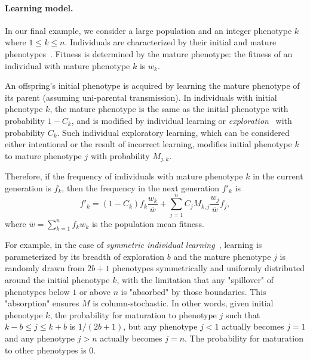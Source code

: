 \documentclass[9pt, a4paper, twocolumn]{extarticle}
\begin{document}
\paragraph*{Learning model.}\label{sec:learn_model}

In our final example, we consider a large population and an integer phenotype $k$ where $1 \le k \le n$.
Individuals are characterized by their initial and mature phenotypes~\citep[pg.~94]{Boyd1985}.
Fitness is determined by the mature phenotype: the fitness of an individual with mature phenotype $k$ is $w_k$.

An offspring's initial phenotype is acquired by learning the mature phenotype of its parent (assuming uni-parental transmission).
In individuals with initial phenotype $k$, the mature phenotype is the same as the initial phenotype with probability $1-C_k$, and is modified by individual learning or \emph{exploration}~\citep{Borenstein2008} with probability $C_k$.
Such individual exploratory learning, which can be considered either intentional or the result of incorrect learning, modifies initial phenotype $k$ to mature phenotype $j$ with probability $M_{j,k}$.

Therefore, if the frequency of individuals with mature phenotype $k$ in the current generation is $f_k$, then the frequency in the next generation $f'_k$ is
\begin{equation}
f'_k = (1-C_k) f_k \frac{w_{k}}{\bar{w}} + \sum_{j=1}^{n}{C_j M_{k,j} \frac{w_{j}}{\bar{w}} f_j },
\end{equation}
where $\bar{w} = \sum_{k=1}^{n}{f_k w_{k}}$ is the population mean fitness.

For example, in the case of \emph{symmetric individual learning}~\citep{Borenstein2008}, learning is parameterized by its breadth of exploration $b$ and the mature phenotype $j$ is randomly drawn from $2b+1$ phenotypes symmetrically and uniformly distributed around the initial phenotype $k$, with the limitation that any "spillover" of phenotypes below $1$ or above $n$ is "absorbed" by those boundaries.
This "absorption" ensures $M$ is column-stochastic. 
In other words, given initial phenotype $k$, the probability for maturation to phenotype $j$ such that $k-b \le j \le k+b$ is $1/(2b+1)$, but any phenotype $j<1$ actually becomes $j=1$ and any phenotype $j>n$ actually becomes $j=n$.
The probability for maturation to other phenotypes is $0$.
\end{document}

